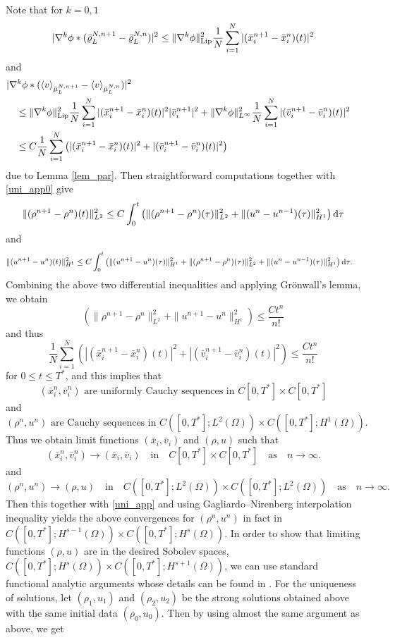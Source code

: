 \documentclass[10pt, reqno]{amsart}
\theoremstyle{definition}
\theoremstyle{remark}
\numberwithin{equation}{section}
\newcommand{\dtau}{\textnormal{d}\tau}
\begin{document}
Note that for $k=0,1$
\[
|\nabla^k \phi *  (\bar\varrho^{N, n+1}_L - \bar\varrho^{N, n}_L)|^2 \leq \|\nabla^k \phi\|_{\rm Lip}^2 \frac1N \sum_{i=1}^N|(\bar{x}_i^{n+1} -\bar{x}_i^{n})(t)|^2
\]
and
\begin{align*}
&|\nabla^k \phi *   (\langle v \rangle_{\bar\mu^{N, n+1}_L} - \langle v \rangle_{\bar\mu^{N, n}_L})|^2 \cr
&\quad \leq \|\nabla^k \phi\|_{\rm Lip}^2 \frac1N \sum_{i=1}^N|(\bar{x}_i^{n+1} -\bar{x}_i^{n})(t)|^2 |\bar v_i^{n+1}|^2 + \|\nabla^k\phi\|_{L^\infty}^2 \frac1N \sum_{i=1}^N  |(\bar{v}_i^{n+1} - \bar{v}_i^{n})(t)|^2 \cr
&\quad \leq C \frac1{N}\sum_{i=1}^N\left(|(\bar{x}_i^{n+1} -\bar{x}_i^{n})(t)|^2 + |(\bar{v}_i^{n+1} - \bar{v}_i^{n})(t)|^2 \right) 
\end{align*}
due to Lemma \ref{lem_par}. Then straightforward computations together with \eqref{uni_app0} give
\[
\|(\rho^{n+1} - \rho^n)(t)\|_{L^2}^2 \leq C\int_0^t \left(\|(\rho^{n+1} - \rho^n)(\tau)\|_{L^2}^2 + \|(u^n - u^{n-1})(\tau)\|_{H^1}^2 \right)\dtau
\]
and
\begin{align*}
&\|(u^{n+1} - u^n)(t)\|_{H^1}^2 \leq C\int_0^t \left(\|(u^{n+1} - u^n)(\tau)\|_{H^1}^2 + \|(\rho^{n+1} - \rho^n)(\tau)\|_{L^2}^2 + \|(u^n - u^{n-1})(\tau)\|_{H^1}^2 \right)\dtau.
\end{align*}
Combining the above two differential inequalities and applying Gr\"onwall's lemma, we obtain
\[
\left( \|\rho^{n+1} - \rho^n\|_{L^2}^2 + \|u^{n+1} - u^n\|_{H^1}^2\right) \leq \frac{Ct^n}{n!}
\]
and thus
\[
\frac1{N}\sum_{i=1}^N\left(|(\bar{x}_i^{n+1} -\bar{x}_i^{n})(t)|^2 + |(\bar{v}_i^{n+1} - \bar{v}_i^{n})(t)|^2 \right)\leq \frac{Ct^n}{n!}
\]
for $0 \leq t \leq T^*$, and this implies that 
\[
(\bar{x}_i^{n},\bar{v}_i^{n}) \mbox{ are uniformly Cauchy sequences in } C[0,T^*]\times C[0,T^*]
\]
and
\[
(\rho^n,u^n) \mbox{ are Cauchy sequences in } C([0,T^*];L^2(\Omega)) \times C([0,T^*];H^1(\Omega)).
\]
Thus we obtain limit functions $(\bar x_i, \bar v_i)$ and $(\rho, u)$ such that
\[
(\bar{x}_i^{n},\bar{v}_i^{n}) \to (\bar x_i,  \bar v_i) \quad \mbox{in} \quad C[0,T^*]\times C[0,T^*]\quad \mbox{as} \quad n \to \infty.
\]
and
\[
(\rho^n,u^n) \to (\rho,  u) \quad \mbox{in} \quad C([0,T^*];L^2(\Omega)) \times C([0,T^*];L^2(\Omega)) \quad \mbox{as} \quad n \to \infty.
\]
Then this together with \eqref{uni_app} and using Gagliardo--Nirenberg interpolation inequality yields the above convergences for $(\rho^n,u^n)$ in fact in $ C([0,T^*];H^{s-1}(\Omega)) \times C([0,T^*];H^s(\Omega))$. In order to show that limiting functions $(\rho,  u)$ are in the desired Sobolev spaces, $C([0,T^*];H^s(\Omega)) \times C([0,T^*];H^{s+1}(\Omega))$, we can use standard functional analytic arguments whose details can be found in \cite[Appendix A]{CCZ16}. For the uniqueness of solutions, let $(\rho_1,u_1)$ and $(\rho_2,u_2)$ be the strong solutions obtained above with the same initial data $(\rho_0,u_0)$. Then by using almost the same argument as above, we get
\end{document}
